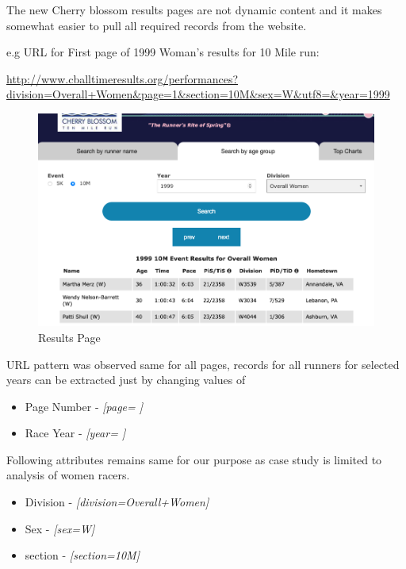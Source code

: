 \documentclass[
]{article}
\providecommand{\tightlist}{%
  \setlength{\itemsep}{0pt}\setlength{\parskip}{0pt}}
\begin{document}
The new Cherry blossom results pages are not dynamic content and it
makes somewhat easier to pull all required records from the website.

e.g URL for First page of 1999 Woman's results for 10 Mile run:

\url{http://www.cballtimeresults.org/performances?division=Overall+Women\&page=1\&section=10M\&sex=W\&utf8=\&year=1999}

\begin{figure}[H]

{\centering \includegraphics[width=1\linewidth,height=1\textheight,]{images/results_page} 

}

\caption{Results Page}\label{fig:unnamed-chunk-3}
\end{figure}

URL pattern was observed same for all pages, records for all runners for
selected years can be extracted just by changing values of

\begin{itemize}
\tightlist
\item
  Page Number - \emph{{[}page= {]}}
\item
  Race Year - \emph{{[}year= {]}}
\end{itemize}

Following attributes remains same for our purpose as case study is
limited to analysis of women racers.

\begin{itemize}
\tightlist
\item
  Division - \emph{{[}division=Overall+Women{]}}
\item
  Sex - \emph{{[}sex=W{]}}
\item
  section - \emph{{[}section=10M{]}}
\end{itemize}
\end{document}
